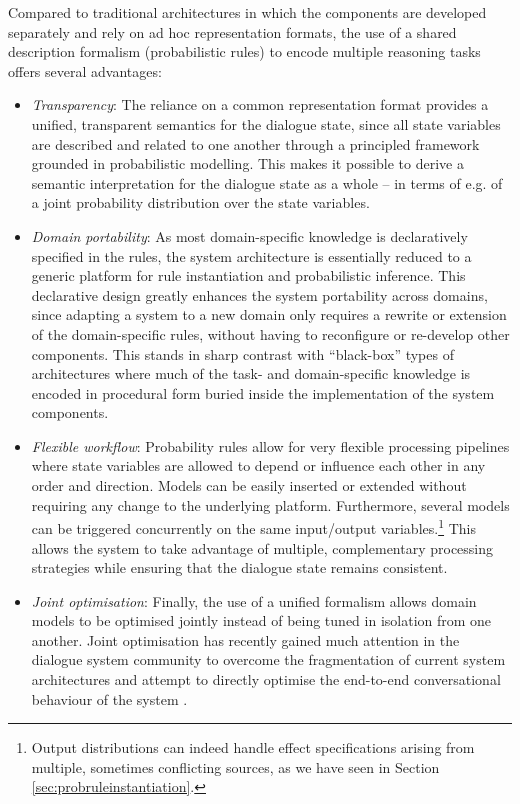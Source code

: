 Compared to traditional architectures in which the components are developed separately and rely on ad hoc representation formats, the use of a shared description formalism (probabilistic rules) to encode multiple reasoning tasks offers several advantages:
\begin{itemize}
\item \textit{Transparency}:  The reliance on a common representation format provides a unified, transparent semantics for the dialogue state, since all state variables are described and related to one another through a principled framework grounded in probabilistic modelling.  This makes it possible to derive a semantic interpretation for the dialogue state as a whole -- in terms of e.g. of a joint probability distribution over the state variables. 

\item \textit{Domain portability}:   As most domain-specific knowledge is declaratively specified in the rules, the system architecture is essentially reduced to a generic platform for rule instantiation and probabilistic inference.  This declarative design greatly enhances the system portability across domains, since adapting a system to a new domain only requires a rewrite or extension of the domain-specific rules, without having to reconfigure or re-develop other components.  This stands in sharp contrast with ``black-box'' types of architectures where much of the task- and domain-specific knowledge is encoded in procedural form buried inside the implementation of the system components.

\item \textit{Flexible workflow}:  Probability rules allow for very flexible processing pipelines where state variables are allowed to depend or influence each other in any order and direction.  Models can be easily inserted or extended without requiring any change to the underlying platform. Furthermore, several models can be triggered concurrently on the same input/output variables.\footnote{Output distributions can indeed handle effect specifications arising from multiple, sometimes conflicting sources, as we have seen in Section \ref{sec:probruleinstantiation}.} This allows the system to take advantage of multiple, complementary processing strategies while ensuring that the dialogue state remains consistent. 

\item \textit{Joint optimisation}:  Finally, the use of a unified formalism allows domain models to be optimised jointly instead of being tuned in isolation from one another. Joint optimisation has recently gained much attention in the dialogue system community to overcome the fragmentation of current system architectures and attempt to directly optimise the end-to-end conversational behaviour of the system \citep[see also][]{Lemon:2011}. 

\end{itemize}

